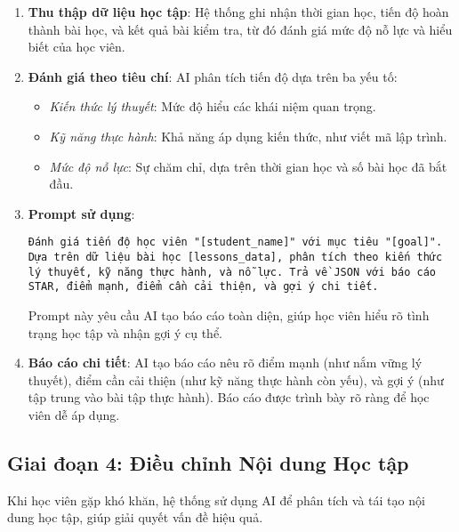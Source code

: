 \begin{enumerate}
	\item \textbf{Thu thập dữ liệu học tập}: Hệ thống ghi nhận thời gian học, tiến độ hoàn thành bài học, và kết quả bài kiểm tra, từ đó đánh giá mức độ nỗ lực và hiểu biết của học viên.

	\item \textbf{Đánh giá theo tiêu chí}: AI phân tích tiến độ dựa trên ba yếu tố:
	      \begin{itemize}
		      \item \textit{Kiến thức lý thuyết}: Mức độ hiểu các khái niệm quan trọng.
		      \item \textit{Kỹ năng thực hành}: Khả năng áp dụng kiến thức, như viết mã lập trình.
		      \item \textit{Mức độ nỗ lực}: Sự chăm chỉ, dựa trên thời gian học và số bài học đã bắt đầu.
	      \end{itemize}

	\item \textbf{Prompt sử dụng}:
	      \begin{Verbatim}[breaklines=true]
		      Đánh giá tiến độ học viên "[student_name]" với mục tiêu "[goal]". Dựa trên dữ liệu bài học [lessons_data], phân tích theo kiến thức lý thuyết, kỹ năng thực hành, và nỗ lực. Trả về JSON với báo cáo STAR, điểm mạnh, điểm cần cải thiện, và gợi ý chi tiết.
	      \end{Verbatim}
	      Prompt này yêu cầu AI tạo báo cáo toàn diện, giúp học viên hiểu rõ tình trạng học tập và nhận gợi ý cụ thể.

	\item \textbf{Báo cáo chi tiết}: AI tạo báo cáo nêu rõ điểm mạnh (như nắm vững lý thuyết), điểm cần cải thiện (như kỹ năng thực hành còn yếu), và gợi ý (như tập trung vào bài tập thực hành). Báo cáo được trình bày rõ ràng để học viên dễ áp dụng.
\end{enumerate}

\subsection{Giai đoạn 4: Điều chỉnh Nội dung Học tập}
Khi học viên gặp khó khăn, hệ thống sử dụng AI để phân tích và tái tạo nội dung học tập, giúp giải quyết vấn đề hiệu quả.

